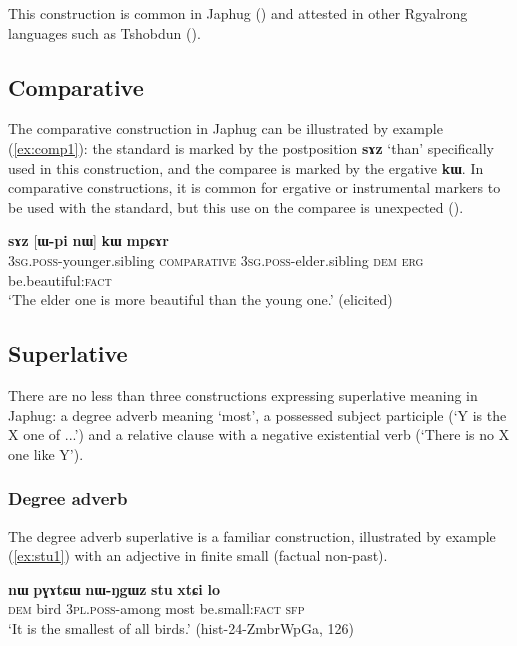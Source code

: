 \documentclass[oneside,a4paper,11pt]{article}
\newcommand{\ipa}[1]{{\phon\textbf{#1}}} %
\begin{document}
This construction is common in Japhug (\citealt[8]{jacques16comparative}) and attested in other Rgyalrong languages such as Tshobdun (\citealt[911]{jackson06guanxiju}).

\subsection{Comparative}
The comparative construction in Japhug can be illustrated by example (\ref{ex:comp1}): the  standard is marked by the postposition \ipa{sɤz} `than' specifically used in this construction, and the comparee is marked by the ergative  \ipa{kɯ}. In comparative constructions, it is common for ergative or instrumental markers to be used with the standard, but this use on the comparee is unexpected (\citealt{jacques16comparative}).

\begin{exe}
\ex \label{ex:comp1}
\gll  \ipa{ɯ-ʁi}   	\ipa{sɤz}   	[\ipa{ɯ-pi}   	\ipa{nɯ}]   	\ipa{\textbf{kɯ}}   	\ipa{mpɕɤr}     \\
\textsc{3sg.poss}-younger.sibling \textsc{comparative} \textsc{3sg.poss}-elder.sibling \textsc{dem} \textsc{erg}  be.beautiful:\textsc{fact} \\
\glt `The elder one is more beautiful than the young one.' (elicited)
\end{exe}

\subsection{Superlative}
There are no less than three constructions expressing superlative meaning in Japhug: a degree adverb meaning `most', a possessed subject participle (`Y is the X one of ...') and a relative clause with a negative existential verb (`There is no X one like Y').

 \subsubsection{Degree adverb}
 The degree adverb superlative is a familiar construction, illustrated by example (\ref{ex:stu1}) with an adjective in finite small (factual non-past).
 
\begin{exe}
\ex \label{ex:stu1}
\gll 
\ipa{nɯ} 	\ipa{pɣɤtɕɯ} 	\ipa{nɯ-ŋgɯz} 	\ipa{stu} 	\ipa{xtɕi} 	\ipa{lo} \\
\textsc{dem} bird \textsc{3pl.poss-}among most be.small:\textsc{fact} \textsc{sfp} \\
\glt `It is the smallest of all birds.' (hist-24-ZmbrWpGa, 126)
\end{exe}
\end{document}
